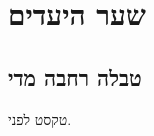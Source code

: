 %
%
%
%

\renewcommand{\lakintabboxclose}{}

\chapter{שער היעדים}

\section{טבלה רחבה מדי}
טקסט לפני.

